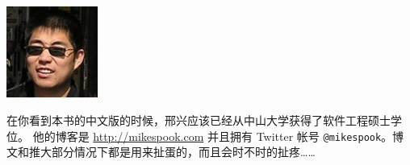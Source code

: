 \includegraphics[width=3cm]{fig/avatar-xingx-128x128}

在你看到本书的中文版的时候，邢兴应该已经从中山大学获得了软件工程硕士学位。
他的博客是 \url{http://mikespook.com} 并且拥有 Twitter 帐号
\texttt{@mikespook}。博文和推大部分情况下都是用来扯蛋的，而且会时不时的扯疼……
